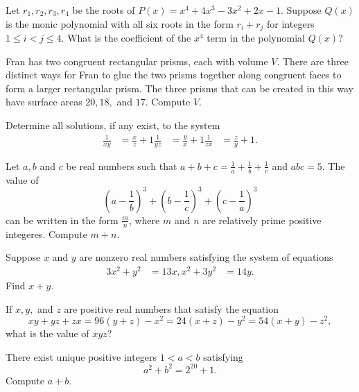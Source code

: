 \documentclass[mast]{lucky}
\begin{document}
  
\begin{prob}[JMC 10 2021/22]{5}
Let $r_1,r_2,r_3,r_4$ be the roots of $P(x)= x^4+4x^3-3x^2+2x-1.$ Suppose $Q(x)$ is the monic polynomial with all six roots in the form $r_{i}+r_{j}$ for integers $1\le i < j \le 4.$ What is the coefficient of the $x^4$ term in the polynomial $Q(x)?$
\end{prob}


\begin{prob}{5}
Fran has two congruent rectangular prisms, each with volume $V$. There are three distinct ways for Fran to glue the two prisms together along congruent faces to form a larger rectangular prism. The three prisms that can be created in this way have surface areas $20,18,$ and $17$. Compute $V$.
\end{prob}


\begin{prob}[vvluo]{6}
Determine all solutions, if any exist, to the system
\begin{align*}
\frac{1}{xy}&=\frac{x}{z}+1 
\frac{1}{yz}&=\frac{y}{x}+1 
\frac{1}{zx}&=\frac{z}{y}+1.
\end{align*}
\end{prob}


\begin{prob}[BMT 2020]{6}
Let $a,b$ and $c$ be real numbers such that $a+b+c=\frac{1}{a}+\frac{1}{b}+\frac{1}{c}$ and $abc=5$. The value of
\[(a-\frac{1}{b})^3+(b-\frac{1}{c})^3+(c-\frac{1}{a})^3\]
can be written in the form $\frac{m}{n}$, where $m$ and $n$ are relatively prime positive integeres. Compute $m+n$.
\end{prob}

\begin{prob}{6}
Suppose $x$ and $y$ are nonzero real numbers satisfying the system of equations
\begin{align*}
    3x^2 + y^2 &= 13x,
    x^2 + 3y^2 &= 14y.
\end{align*}
Find $x+y$.
\end{prob}



\begin{req}[JMC 10 2021/18]{9}
If $x,y,$ and $z$ are positive real numbers that satisfy the equation
\[xy+yz+zx=96(y+z)-x^2 = 24(x+z) -y^2 = 54(x+y) -z^2,\]
what is the value of $xyz$?
\end{req}

\begin{prob}[CARML 2019/8]{13}
There exist unique positive integers $1<a<b$ satisfying
\[a^2+b^2=2^{20}+1.\]
Compute $a+b$.
\end{prob}
\end{document}
